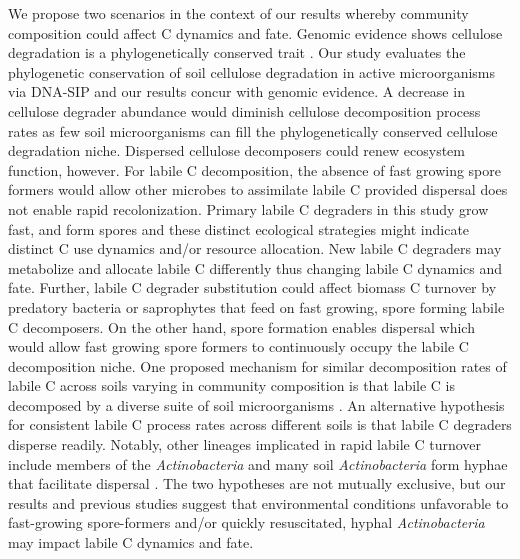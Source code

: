 We propose two scenarios in the context of our results whereby community
composition could affect C dynamics and fate. Genomic evidence shows cellulose
degradation is a phylogenetically conserved trait \citep{Berlemont2013}. Our
study evaluates the phylogenetic conservation of soil cellulose degradation in
active microorganisms via DNA-SIP and our results concur with genomic
evidence. A decrease in cellulose degrader abundance would diminish
cellulose decomposition process rates as few soil microorganisms can fill the
phylogenetically conserved cellulose degradation niche. Dispersed cellulose
decomposers could renew ecosystem function, however. For labile
C decomposition, the absence of fast growing spore formers would allow other
microbes to assimilate labile C provided dispersal does not enable rapid
recolonization. Primary labile C degraders in this study grow fast, and form
spores and these distinct ecological strategies might indicate distinct C use
dynamics and/or resource allocation. New labile C degraders may metabolize and
allocate labile C differently thus changing labile C dynamics and fate.
Further, labile C degrader substitution could affect biomass C turnover by
predatory bacteria or saprophytes that feed on fast growing, spore forming
labile C decomposers. On the other hand, spore formation enables dispersal
\citep{Nicholson2000} which would allow fast growing spore formers to
continuously occupy the labile C decomposition niche. One proposed mechanism
for similar decomposition rates of labile C across soils varying in community
composition is that labile C is decomposed by a diverse suite of soil
microorganisms \citep{McGuire2010}. An alternative hypothesis for consistent
labile C process rates across different soils is that labile C degraders
disperse readily. Notably, other lineages implicated in rapid labile C turnover
include members of the \textit{Actinobacteria} \citep{Placella2012} and many
soil \textit{Actinobacteria} form hyphae that facilitate dispersal
\citep{KILLHAM2007}. The two hypotheses are not mutually exclusive, but our
results and previous studies suggest that environmental conditions unfavorable
to fast-growing spore-formers and/or quickly resuscitated, hyphal
\textit{Actinobacteria} may impact labile C dynamics and fate.

